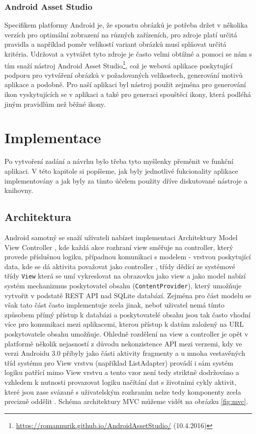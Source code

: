 \documentclass[czech,master,public,dept460,male,java,cpdeclaration]{diploma}
\begin{document}
 \subsubsection{Android Asset Studio}
 Specifikem platformy Android je, že spoustu obrázků je potřeba držet v několika verzích pro optimální
 zobrazení na různých zařízeních, pro zdroje platí určitá pravidla a například poměr velikostí variant
 obrázků musí splňovat určitá kritéria. Udržovat a vytvářet tyto zdroje je často velmi obtížné
 a pomoci se nám s tím snaží nástroj Android Asset Studio\footnote{\url{https://romannurik.github.io/AndroidAssetStudio/} (10.4.2016)}, což je webová aplikace poskytující
 podporu pro vytváření obrázků v požadovaných velikostech, generování motivů aplikace a podobně.
 Pro naší aplikaci byl nástroj použit zejména pro generování ikon vyskytujících se v aplikaci
 a také pro generaci spouštěcí ikony, která podléhá jiným pravidlům než běžné ikony.


\section{Implementace}
Po vytvoření zadání a návrhu bylo třeba tyto myšlenky přeměnit ve funkční aplikaci. V této kapitole si popíšeme,
jak byly jednotlivé fukcionality aplikace implementovány a jak byly za tímto účelem použity dříve diskutované nástroje a knihovny.

\subsection{Architektura}
Android samotný se snaží uživateli nabízet implementaci Architektury Model View Controller \cite{bestpracticesfuturice}, kde
každá akce rozhraní view směřuje na controller, který provede příslušnou logiku, případnou komunikaci
s modelem - vrstvou poskytující data,
kde se dá aktivita považovat jako controller \cite{mvcxmvp}, třídy dědící ze systémové třídy \texttt{View} která
se umí vykreslovat na obrazovku jako view a jako model nabízí systém mechanizmus poskytovatel obsahu
 (\texttt{ContentProvider}), který umožňuje vytvořit v podstatě REST API nad SQLite databází.
Zejména pro část modelu se však tato část často implementuje zcela jinak, neboť uživatel nemá tímto způsobem
přímý přístup k databázi a poskytovatelé obsahu jsou tak často vhodní více pro komunikaci mezi aplikacemi,
kterou přístup k datům založený na URL poskytovatele obsahu umožňuje. Ohledně rozdělení na view a controller je opět
v platformě několik nejasností z důvodu nekonzistence API mezi verzemi, kdy ve verzi Androidu 3.0 přibyly
jako části aktivity fragmenty a u mnoha vestavěných tříd systému pro View vrstvu (například ListAdapter)
provádí i sám systém logiku patřící mimo View vrstvu a tento vzor není tedy striktně dodržováno a vzhledem
k nutnosti provazovat logiku načítání dat s životními cykly aktivit, které jsou zase svázané s uživatelským
rozhraním nelze tedy komponenty zcela precizně oddělit \cite{mvcxmvp}.
Schéma architektury MVC můžeme vidět na obrázku \ref{fig:mvc}.
\end{document}
